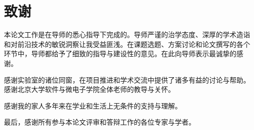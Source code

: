 \chapter{致谢}

本论文工作是在导师的悉心指导下完成的。导师严谨的治学态度、深厚的学术造诣和对前沿技术的敏锐洞察让我受益匪浅。在课题选题、方案讨论和论文撰写的各个环节中，导师都给予了细致的指导与建设性的意见。在此向导师表示最诚挚的感谢。

感谢实验室的诸位同窗，在项目推进和学术交流中提供了诸多有益的讨论与帮助。感谢北京大学软件与微电子学院全体老师的教导与关怀。

感谢我的家人多年来在学业和生活上无条件的支持与理解。

最后，感谢所有参与本论文评审和答辩工作的各位专家与学者。
